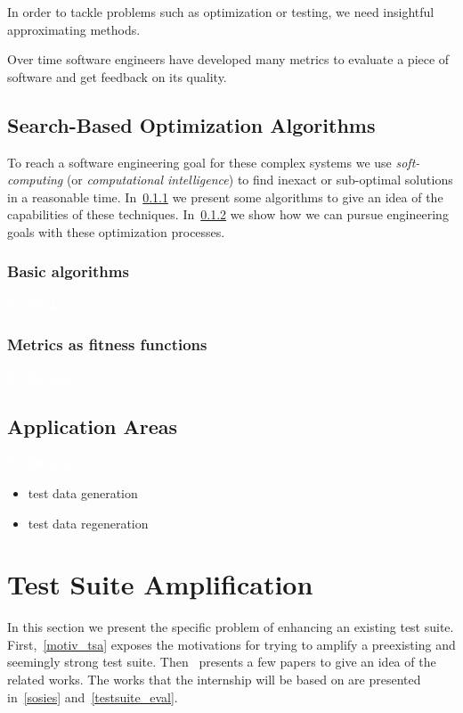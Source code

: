 \documentclass[11pt]{sdm}
\newcommand{\todo}[1]{\colorbox{Red!75}{\textcolor{white}{\textbf{TODO\ifx&#1&\else: #1\fi}}}}
\begin{document}
In order to tackle problems such as optimization or testing, we need insightful approximating methods.

Over time software engineers have developed many metrics to evaluate a piece of software and get feedback on its quality.

\cite{mcminn2011search}

\subsection{Search-Based Optimization Algorithms}
\label{example_algo}

To reach a software engineering goal for these complex systems we use \textit{soft-computing} (or \textit{computational intelligence}) to find inexact or sub-optimal solutions in a reasonable time.
In~\ref{basic_algo} we present some algorithms to give an idea of the capabilities of these techniques.
In~\ref{fitness_func} we show how we can pursue engineering goals with these optimization processes.

\subsubsection{Basic algorithms}
\label{basic_algo}
\todo{}

\subsubsection{Metrics as fitness functions}
\label{fitness_func}
\todo{}

\subsection{Application Areas}
\label{applications}
\todo{}

\begin{itemize}
  \item test data generation
  \item test data regeneration
\end{itemize}

\cite{danglot2017emerging}
\cite{xuan2015dynamic}


\section{Test Suite Amplification}
\label{tsa}
In this section we present the specific problem of enhancing an existing test suite.
First,~\ref{motiv_tsa} exposes the motivations for trying to amplify a preexisting and seemingly strong test suite.
Then~ presents a few papers to give an idea of the related works.
The works that the internship will be based on are presented in~\ref{sosies} and~\ref{testsuite_eval}.
\end{document}
